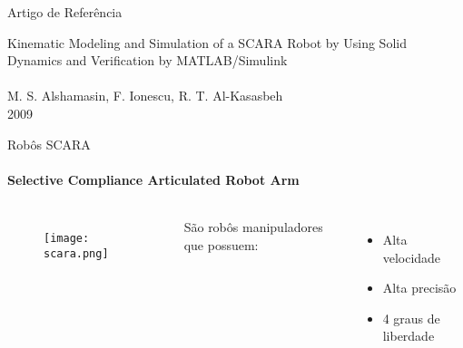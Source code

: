 \begin{frame}[t]{Artigo de Referência} 
    \begin{center}
        \huge 
        Kinematic Modeling and Simulation of a SCARA Robot by Using Solid Dynamics and Verification by
        MATLAB/Simulink\\
        \!
        \\
        \normalsize
        M. S. Alshamasin, F. Ionescu, R. T. Al-Kasasbeh\\
        2009
        
    \end{center}
\end{frame}
\begin{frame}[c]{Robôs SCARA}
    \framesubtitle{Selective Compliance Articulated Robot Arm} 
    \begin{columns}

        \begin{figure}
            \texttt{[image: scara.png]}
        \end{figure}

        \Large
        São robôs manipuladores que possuem:
        \begin{itemize}
            \item Alta velocidade
            \item Alta precisão
            \item 4 graus de liberdade
        \end{itemize}
    \end{columns}
   
\end{frame}
